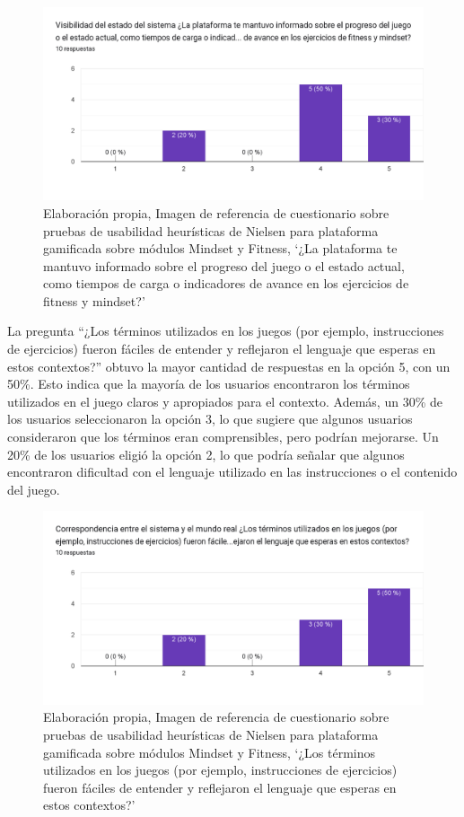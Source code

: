 \begin{figure}[H]
  \centering
  \includegraphics[width=0.7\linewidth]{Imagenes/Nc1.png}
  \caption{Elaboración propia, Imagen de referencia de cuestionario sobre pruebas de usabilidad heurísticas de Nielsen para plataforma gamificada sobre módulos Mindset y Fitness, `¿La plataforma te mantuvo informado sobre el progreso del juego o el estado actual, como tiempos de carga o indicadores de avance en los ejercicios de fitness y mindset?'}

  \label{fig:cuestionario1nielsen}
\end{figure}

La pregunta ``¿Los términos utilizados en los juegos (por ejemplo, instrucciones de ejercicios) fueron fáciles de entender y reflejaron el lenguaje que esperas en estos contextos?'' obtuvo la mayor cantidad de respuestas en la opción 5, con un 50\%. Esto indica que la mayoría de los usuarios encontraron los términos utilizados en el juego claros y apropiados para el contexto. Además, un 30\% de los usuarios seleccionaron la opción 3, lo que sugiere que algunos usuarios consideraron que los términos eran comprensibles, pero podrían mejorarse. Un 20\% de los usuarios eligió la opción 2, lo que podría señalar que algunos encontraron dificultad con el lenguaje utilizado en las instrucciones o el contenido del juego.

\begin{figure}[H]
  \centering
  \includegraphics[width=0.7\linewidth]{Imagenes/Nc2.png}
  \caption{Elaboración propia, Imagen de referencia de cuestionario sobre pruebas de usabilidad heurísticas de Nielsen para plataforma gamificada sobre módulos Mindset y Fitness, `¿Los términos utilizados en los juegos (por ejemplo, instrucciones de ejercicios) fueron fáciles de entender y reflejaron el lenguaje que esperas en estos contextos?'}

  \label{fig:cuestionario2nielsen}
\end{figure}

